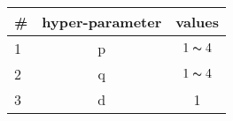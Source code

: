 \begin{tabular}{lcc}
\toprule
\# & hyper-parameter      & values\\ \hline
\midrule

1 & p & $1 \thicksim 4$               \\ \hline
2 & q & $1 \thicksim 4$               \\ \hline
3 & d & 1               \\ \hline
\bottomrule
\end{tabular}
